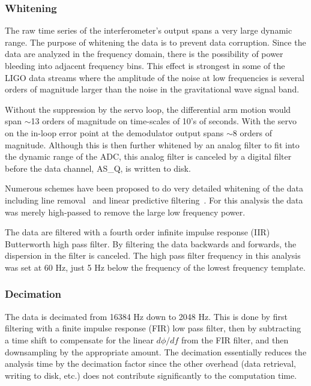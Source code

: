 \subsubsection{Whitening}

The raw time series of the interferometer's output spans a very large dynamic range.
The purpose of whitening the data is to prevent data corruption.
Since the data are analyzed in the frequency domain, there is the possibility
of power bleeding into adjacent frequency bins. This effect is strongest
in some of the LIGO data streams where the amplitude of the noise at low 
frequencies is several orders of magnitude larger than the noise in the
gravitational wave signal band.

Without the suppression by the servo loop, the differential arm motion
would span $\sim$13 orders of magnitude on time-scales of 10's of
seconds. With the servo on the in-loop error point at the demodulator output 
spans $\sim$8 orders of magnitude. Although this is then 
further whitened by an analog filter to fit into the dynamic range of
the ADC, this analog filter is canceled by a digital filter before the
data channel, AS\_Q, is written to disk.

Numerous schemes have been proposed to do very detailed whitening of
the data including line removal~\cite{Hua:60Hz} and linear predictive
filtering~\cite{Shourov:LPF}. For
this analysis the data was merely high-passed to remove the large low
frequency power. 

The data are filtered with a fourth order infinite impulse response (IIR) 
Butterworth high pass filter. By filtering
the data backwards and forwards, the dispersion in the filter is canceled. 
The high pass filter frequency in this analysis was set at 60 Hz, 
just 5 Hz below the frequency of the lowest frequency template.


\subsubsection{Decimation}

The data is decimated from 16384 Hz down to 2048 Hz. This is done by first
filtering with a finite impulse response (FIR) low pass filter, then by
subtracting  a time shift to compensate for the linear $d\phi/df$ from
the FIR filter, and then downsampling by the appropriate amount. The
decimation essentially reduces the analysis time by the decimation factor
since the other overhead (data retrieval, writing to disk, etc.) does
not contribute significantly to the computation time.

